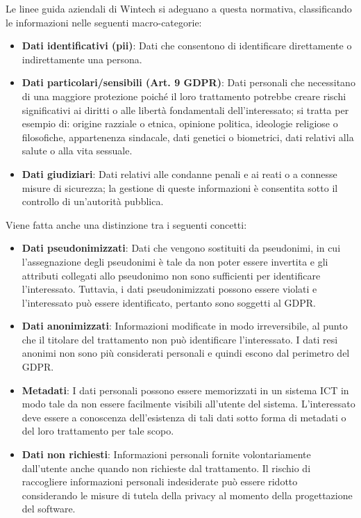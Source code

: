 Le linee guida aziendali di Wintech si adeguano a questa normativa, classificando le informazioni nelle seguenti macro-categorie:
\begin{itemize}
    \item \textbf{Dati identificativi (\gls{pii})}: Dati che consentono di identificare direttamente o indirettamente una persona.
    \item \textbf{Dati particolari/sensibili (Art. 9 GDPR)}: Dati personali che necessitano di una maggiore protezione poiché il loro trattamento potrebbe creare rischi significativi ai diritti o alle libertà fondamentali dell'interessato; si tratta per esempio di: origine razziale o etnica, opinione politica, ideologie religiose o filosofiche, appartenenza sindacale, dati genetici o biometrici, dati relativi alla salute o alla vita sessuale.
    \item \textbf{Dati giudiziari}: Dati relativi alle condanne penali e ai reati o a connesse misure di sicurezza; la gestione di queste informazioni è consentita sotto il controllo di un'autorità pubblica.
\end{itemize}

\noindent Viene fatta anche una distinzione tra i seguenti concetti:
\begin{itemize}
    \item \textbf{Dati pseudonimizzati}: Dati che vengono sostituiti da pseudonimi, in cui l'assegnazione degli pseudonimi è tale da non poter essere invertita e gli attributi collegati allo pseudonimo non sono sufficienti per identificare l'interessato. Tuttavia, i dati pseudonimizzati possono essere violati e l'interessato può essere identificato, pertanto sono soggetti al GDPR.
    \item \textbf{Dati anonimizzati}: Informazioni modificate in modo irreversibile, al punto che il titolare del trattamento non può identificare l'interessato. I dati resi anonimi non sono più considerati personali e quindi escono dal perimetro del GDPR.
    \item \textbf{Metadati}: I dati personali possono essere memorizzati in un sistema ICT in modo tale da non essere facilmente visibili all'utente del sistema. L'interessato deve essere a conoscenza dell'esistenza di tali dati sotto forma di metadati o del loro trattamento per tale scopo.
    \item \textbf{Dati non richiesti}: Informazioni personali fornite volontariamente dall'utente anche quando non richieste dal trattamento. Il rischio di raccogliere informazioni personali indesiderate può essere ridotto considerando le misure di tutela della privacy al momento della progettazione del software.
\end{itemize}

